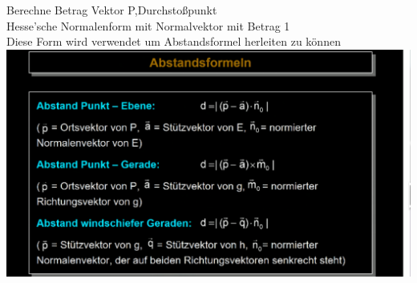 \documentclass{article}
\begin{document}
	Berechne Betrag Vektor P,Durchstoßpunkt \\
	Hesse'sche Normalenform mit Normalvektor mit Betrag 1 \\
	Diese Form wird verwendet um Abstandsformel herleiten zu können \\
	\includegraphics[width=\linewidth]{formeln}
\end{document}
